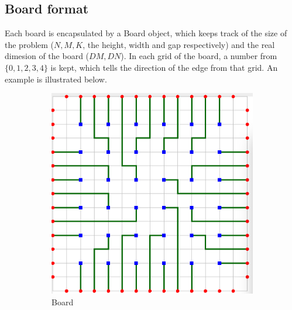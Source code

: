 \documentclass{article}
\begin{document}
\begin{spacing}{1.1}
    \subsection{Board format}
    \label{DAT:BOARD}
    Each board is encapsulated by a Board object, which keeps track of the size of the problem ($N, M, K$, the height, width and gap respectively) and the real dimesion of the board ($DM, DN$). In each grid of the board, a
    number from $\{0, 1, 2, 3, 4\}$ is kept, which tells the direction of the edge from that grid. An example is illustrated below.
    \begin{figure}[H]
        \centering
        \begin{subfigure}{0.4\textwidth}
            \includegraphics[width = \textwidth]{dat1.png}
            \caption{Board}
        \end{subfigure}
        \begin{subfigure}{0.4\textwidth}

\end{subfigure}
\end{figure}
\end{spacing}
\end{document}
